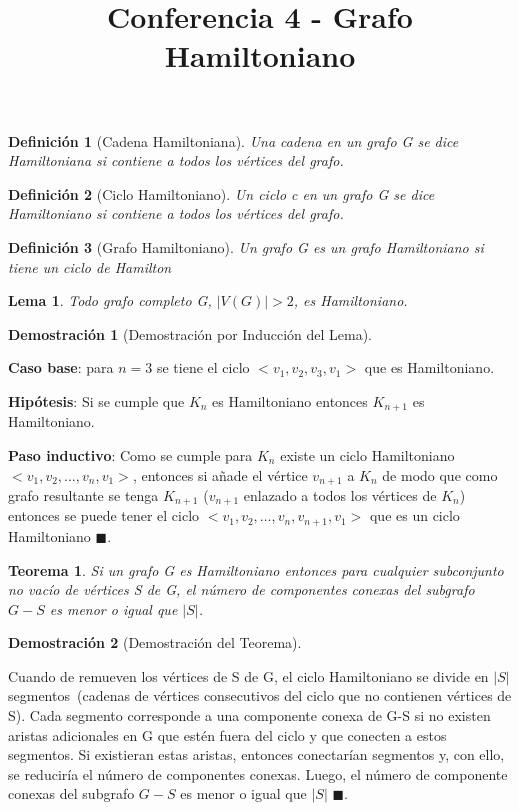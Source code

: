\documentclass[a4paper,1pt]{report}
\title{Conferencia 4 - Grafo Hamiltoniano}
\author{}
\newtheorem*{teo}{Teorema}
\newtheorem*{dem}{Demostración}
\newtheorem*{dfn}{Definición}
\newtheorem*{lem}{Lema}
\begin{document}
\maketitle

\begin{dfn}[Cadena Hamiltoniana] 
Una cadena en un grafo G se dice Hamiltoniana si contiene a
todos los vértices del grafo.
\end{dfn}

\begin{dfn}[Ciclo Hamiltoniano]
Un ciclo c en un grafo G se dice Hamiltoniano si contiene a todos los vértices del grafo.
\end{dfn}

\begin{dfn}[Grafo Hamiltoniano]
Un grafo G es un grafo Hamiltoniano si tiene un ciclo de Hamilton
\end{dfn}

\begin{lem}
 Todo grafo completo G, $|V(G)|>2$, es Hamiltoniano. 
\end{lem}


\begin{dem}[Demostración por Inducción del Lema]
 
\end{dem}

\textbf{Caso base}: para $n=3$ se tiene el ciclo  $<v_1,v_2,v_3,v_1>$ que es Hamiltoniano.

\textbf{Hipótesis}: Si se cumple que $K_n$ es Hamiltoniano entonces $K_{n+1}$ es Hamiltoniano.

\textbf{Paso inductivo}: Como se cumple para $K_n$ existe un ciclo Hamiltoniano $<v_1,v_2,\dots,v_n,v_1>$, entonces si añade el vértice $v_{n+1}$ a $K_n$ de modo que como grafo resultante se tenga $K_{n+1}$ ($v_{n+1}$ enlazado a todos los vértices de $K_n$) entonces se puede tener el ciclo $<v_1,v_2,\dots,v_n,v_{n+1},v_1>$ que es un ciclo Hamiltoniano $\blacksquare$. 


\begin{teo}
 Si un grafo G es Hamiltoniano entonces para cualquier subconjunto no vacío de vértices S de G, el número de componentes conexas del subgrafo $G - S$ es menor o igual que  $|S|$.
\end{teo}


\begin{dem}[Demostración del Teorema]
 
\end{dem}
 Cuando de remueven los vértices de S de G, el ciclo Hamiltoniano se divide en $|S|$ segmentos~(cadenas de vértices consecutivos del ciclo que no contienen vértices de S). Cada segmento corresponde a una componente conexa de G-S si no existen aristas adicionales en G que estén fuera del ciclo y que conecten a estos segmentos. Si existieran estas aristas, entonces conectarían segmentos y, con ello, se reduciría el número de componentes conexas. Luego, el número de componente conexas del subgrafo $G - S$ es menor o igual que  $|S|$ $\blacksquare$.
\end{document}
